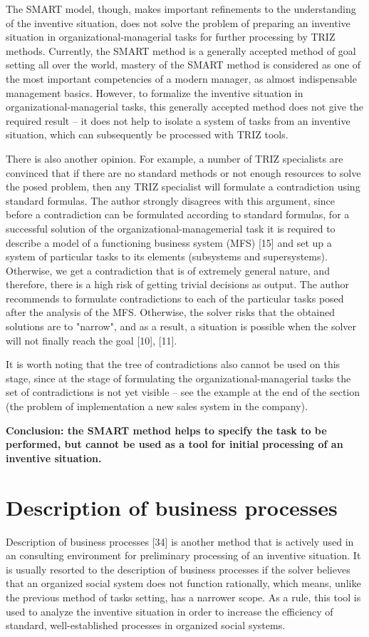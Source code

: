 \documentclass[11pt,a4paper]{book}
\begin{document}
The SMART model, though, makes important refinements to the understanding of
the inventive situation, does not solve the problem of preparing an inventive
situation in organizational-managerial tasks for further processing by TRIZ
methods. Currently, the SMART method is a generally accepted method of goal
setting all over the world, mastery of the SMART method is considered as one
of the most important competencies of a modern manager, as almost
indispensable management basics. However, to formalize the inventive situation
in organizational-managerial tasks, this generally accepted method does not
give the required result -- it does not help to isolate a system of tasks from
an inventive situation, which can subsequently be processed with TRIZ tools.

There is also another opinion. For example, a number of TRIZ specialists are
convinced that if there are no standard methods or not enough resources to
solve the posed problem, then any TRIZ specialist will formulate a
contradiction using standard formulas.  The author strongly disagrees with
this argument, since before a contradiction can be formulated according to
standard formulas, for a successful solution of the
organizational-managemerial task it is required to describe a model of a
functioning business system (MFS) [15] and set up a system of particular tasks
to its elements (subsystems and supersystems).  Otherwise, we get a
contradiction that is of extremely general nature, and therefore, there is a
high risk of getting trivial decisions as output. The author recommends to
formulate contradictions to each of the particular tasks posed after the
analysis of the MFS. Otherwise, the solver risks that the obtained solutions
are to "narrow", and as a result, a situation is possible when the solver will
not finally reach the goal [10], [11].

It is worth noting that the tree of contradictions also cannot be used on this
stage, since at the stage of formulating the organizational-managerial tasks
the set of contradictions is not yet visible -- see the example at the end of
the section (the problem of implementation a new sales system in the company).

\textbf{Conclusion: the SMART method helps to specify the task to be
  performed, but cannot be used as a tool for initial processing of an
  inventive situation.}

\section{Description of business processes} 
Description of business processes [34] is another method that is actively used
in an consulting environment for preliminary processing of an inventive
situation.  It is usually resorted to the description of business processes if
the solver believes that an organized social system does not function
rationally, which means, unlike the previous method of tasks setting, has a
narrower scope. As a rule, this tool is used to analyze the inventive
situation in order to increase the efficiency of standard, well-established
processes in organized social systems.
\end{document}
